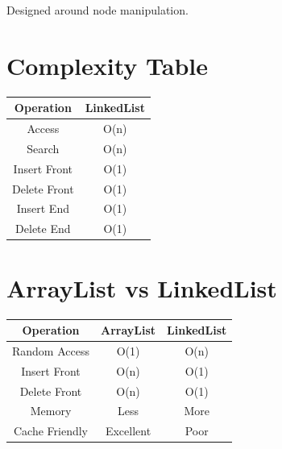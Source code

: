 \documentclass[11pt,a4paper]{book}
\begin{document}

Designed around node manipulation.


\section{Complexity Table}

\begin{center}

\begin{tabular}{|c|c|}
\hline
Operation & LinkedList \\
\hline

Access &
O(n)
\\
\hline

Search &
O(n)
\\
\hline

Insert Front &
O(1)
\\
\hline

Delete Front &
O(1)
\\
\hline

Insert End &
O(1)
\\
\hline

Delete End &
O(1)
\\
\hline

\end{tabular}

\end{center}


\section{ArrayList vs LinkedList}

\begin{center}

\begin{tabular}{|c|c|c|}
\hline
Operation &
ArrayList &
LinkedList \\
\hline

Random Access &
O(1) &
O(n) \\
\hline

Insert Front &
O(n) &
O(1) \\
\hline

Delete Front &
O(n) &
O(1) \\
\hline

Memory &
Less &
More \\
\hline

Cache Friendly &
Excellent &
Poor \\
\hline

\end{tabular}

\end{center}
\end{document}
